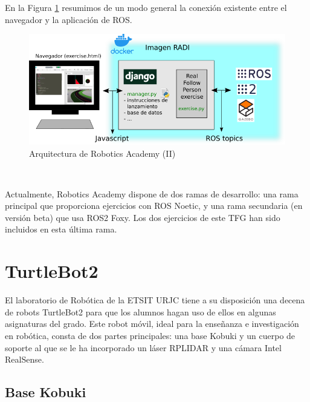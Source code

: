 En la Figura \ref{fig:infraestructura_robotics_academy} resumimos de un modo general la conexión existente entre el navegador y la aplicación de ROS.

\begin{figure} [H]
  \begin{center}
    \includegraphics[width=15cm]{imagenes/cap3/esquema-robotics-academy.png}
  \end{center}
  \caption{Arquitectura de Robotics Academy (II)}
  \label{fig:infraestructura_robotics_academy}
\end{figure}\

Actualmente, Robotics Academy dispone de dos ramas de desarrollo: una rama principal que proporciona ejercicios con ROS Noetic, y una rama secundaria (en versión beta) que usa ROS2 Foxy. Los dos ejercicios de este TFG han sido incluidos en esta última rama. 


\section{TurtleBot2}
\label{sec:turtlebot2}

El laboratorio de Robótica de la ETSIT URJC tiene a su disposición una decena de robots TurtleBot2 para que los alumnos hagan uso de ellos en algunas asignaturas del grado. Este robot móvil, ideal para la enseñanza e investigación en robótica, consta de dos partes principales: una base Kobuki y un cuerpo de soporte al que se le ha incorporado un láser RPLIDAR y una cámara Intel RealSense.\\

\subsection{Base Kobuki}
\label{subsec:turtlebot_base_kobuki}

